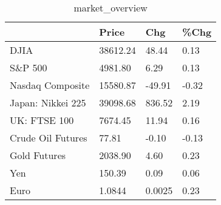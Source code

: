 \documentclass{article}%
\begin{document}
%


\begin{table}[htbp]%
\caption{market\_overview}%
\centering%
\begin{adjustbox}{width=1\textwidth}%
\begin{tabular}{llll}
\toprule
                  &    Price &    Chg &  \%Chg \\
\midrule
             DJIA & 38612.24 &  48.44 &  0.13 \\
          S\&P 500 &  4981.80 &   6.29 &  0.13 \\
 Nasdaq Composite & 15580.87 & -49.91 & -0.32 \\
Japan: Nikkei 225 & 39098.68 & 836.52 &  2.19 \\
     UK: FTSE 100 &  7674.45 &  11.94 &  0.16 \\
Crude Oil Futures &    77.81 &  -0.10 & -0.13 \\
     Gold Futures &  2038.90 &   4.60 &  0.23 \\
              Yen &   150.39 &   0.09 &  0.06 \\
             Euro &   1.0844 & 0.0025 &  0.23 \\
\bottomrule
\end{tabular}
%
\end{adjustbox}%
\end{table}

%
\end{document}
